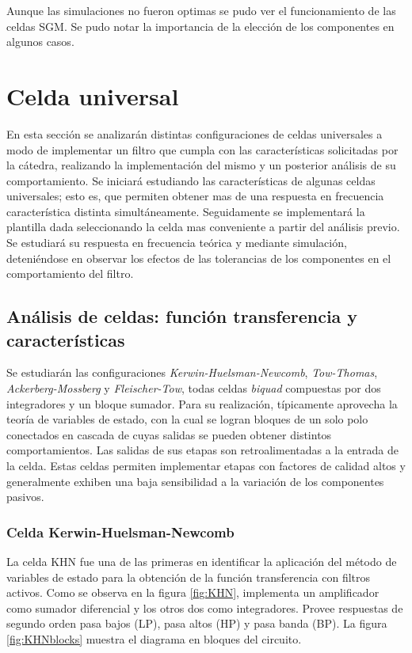 Aunque las simulaciones no fueron optimas se pudo ver el funcionamiento de las celdas SGM. Se pudo notar la importancia de la elección de los componentes en algunos casos.


\section{Celda universal}

En esta sección se analizarán distintas configuraciones de celdas universales a modo de implementar un filtro que cumpla con las características solicitadas por la cátedra, realizando la implementación del mismo y un posterior análisis de su comportamiento. Se iniciará estudiando las características de algunas celdas universales; esto es, que permiten obtener mas de una respuesta en frecuencia característica distinta simultáneamente. Seguidamente se implementará la plantilla dada seleccionando la celda mas conveniente a partir del análisis previo. Se estudiará su respuesta en frecuencia teórica y mediante simulación, deteniéndose en observar los efectos de las tolerancias de los componentes en el comportamiento del filtro. 

\subsection{Análisis de celdas: función transferencia y características}

Se estudiarán las configuraciones \emph{Kerwin-Huelsman-Newcomb}, \emph{Tow-Thomas}, \emph{Ackerberg-Mossberg} y \emph{Fleischer-Tow}, todas celdas \emph{biquad} compuestas por dos integradores y un bloque sumador. Para su realización, típicamente aprovecha la teoría de variables de estado, con la cual se logran bloques de un solo polo conectados en cascada de cuyas salidas se pueden obtener distintos comportamientos. Las salidas de sus etapas son retroalimentadas a la entrada de la celda. 
Estas celdas permiten implementar etapas con factores de calidad altos y generalmente exhiben una baja sensibilidad a la variación de los componentes pasivos. 




\subsubsection{Celda Kerwin-Huelsman-Newcomb}

La celda KHN fue una de las primeras en identificar la aplicación del método de variables de estado para la obtención de la función transferencia con filtros activos. Como se observa en la figura \ref{fig:KHN}, implementa un amplificador como sumador diferencial y los otros dos como integradores. Provee respuestas de segundo orden pasa bajos (LP), pasa altos (HP) y pasa banda (BP). La figura \ref{fig:KHNblocks} muestra el diagrama en bloques del circuito.

